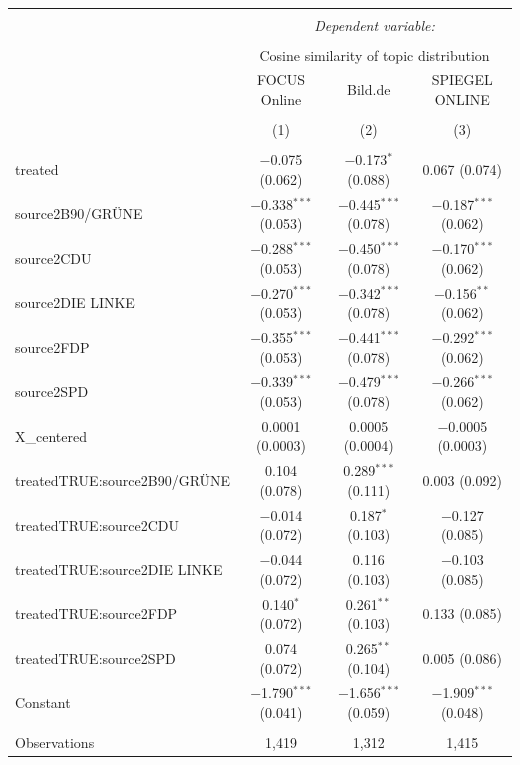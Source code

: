 \documentclass[
]{article}
\begin{document}
\begin{table}[!htbp] \centering 
  \caption{} 
  \label{} 
\tiny 
\begin{tabular}{@{\extracolsep{5pt}}lccc} 
\\[-1.8ex]\hline 
\hline \\[-1.8ex] 
 & \multicolumn{3}{c}{\textit{Dependent variable:}} \\ 
\cline{2-4} 
\\[-1.8ex] & \multicolumn{3}{c}{Cosine similarity of topic distribution} \\ 
 & FOCUS Online & Bild.de & SPIEGEL ONLINE \\ 
\\[-1.8ex] & (1) & (2) & (3)\\ 
\hline \\[-1.8ex] 
 treated & $-$0.075 (0.062) & $-$0.173$^{*}$ (0.088) & 0.067 (0.074) \\ 
  source2B90/GRÜNE & $-$0.338$^{***}$ (0.053) & $-$0.445$^{***}$ (0.078) & $-$0.187$^{***}$ (0.062) \\ 
  source2CDU & $-$0.288$^{***}$ (0.053) & $-$0.450$^{***}$ (0.078) & $-$0.170$^{***}$ (0.062) \\ 
  source2DIE LINKE & $-$0.270$^{***}$ (0.053) & $-$0.342$^{***}$ (0.078) & $-$0.156$^{**}$ (0.062) \\ 
  source2FDP & $-$0.355$^{***}$ (0.053) & $-$0.441$^{***}$ (0.078) & $-$0.292$^{***}$ (0.062) \\ 
  source2SPD & $-$0.339$^{***}$ (0.053) & $-$0.479$^{***}$ (0.078) & $-$0.266$^{***}$ (0.062) \\ 
  X\_centered & 0.0001 (0.0003) & 0.0005 (0.0004) & $-$0.0005 (0.0003) \\ 
  treatedTRUE:source2B90/GRÜNE & 0.104 (0.078) & 0.289$^{***}$ (0.111) & 0.003 (0.092) \\ 
  treatedTRUE:source2CDU & $-$0.014 (0.072) & 0.187$^{*}$ (0.103) & $-$0.127 (0.085) \\ 
  treatedTRUE:source2DIE LINKE & $-$0.044 (0.072) & 0.116 (0.103) & $-$0.103 (0.085) \\ 
  treatedTRUE:source2FDP & 0.140$^{*}$ (0.072) & 0.261$^{**}$ (0.103) & 0.133 (0.085) \\ 
  treatedTRUE:source2SPD & 0.074 (0.072) & 0.265$^{**}$ (0.104) & 0.005 (0.086) \\ 
  Constant & $-$1.790$^{***}$ (0.041) & $-$1.656$^{***}$ (0.059) & $-$1.909$^{***}$ (0.048) \\ 
 \hline \\[-1.8ex] 
Observations & 1,419 & 1,312 & 1,415 \\ 

\end{tabular}
\end{table}
\end{document}
